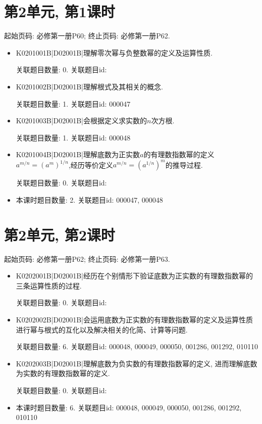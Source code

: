 \section*{第2单元, 第1课时}
起始页码: 必修第一册P60; 终止页码: 必修第一册P62.
\begin{itemize}
\item K0201001B|D02001B|理解零次幂与负整数幂的定义及运算性质.

关联题目数量: 0. 关联题目id: 

\item K0201002B|D02001B|理解根式及其相关的概念.

关联题目数量: 1. 关联题目id: 000047

\item K0201003B|D02001B|会根据定义求实数的$n$次方根.

关联题目数量: 1. 关联题目id: 000048

\item K0201004B|D02001B|理解底数为正实数$a$的有理数指数幂的定义$a^{m/n}=(a^{m})^{1/n}$,经历等价定义$a^{m/n}= (a^{1/n})^{m}$的推导过程.

关联题目数量: 0. 关联题目id: 

\item 本课时题目数量: 2. 关联题目id: 000047, 000048

\end{itemize}

\section*{第2单元, 第2课时}
起始页码: 必修第一册P62; 终止页码: 必修第一册P63.
\begin{itemize}
\item K0202001B|D02001B|经历在个别情形下验证底数为正实数的有理数指数幂的三条运算性质的过程.

关联题目数量: 0. 关联题目id: 

\item K0202002B|D02001B|会运用底数为正实数的有理数指数幂的定义及运算性质进行幂与根式的互化以及解决相关的化简、计算等问题.

关联题目数量: 6. 关联题目id: 000048, 000049, 000050, 001286, 001292, 010110

\item K0202003B|D02001B|理解底数为负实数的有理数指数幂的定义, 进而理解底数为实数的有理数指数幂的定义.

关联题目数量: 0. 关联题目id: 

\item 本课时题目数量: 6. 关联题目id: 000048, 000049, 000050, 001286, 001292, 010110

\end{itemize}

